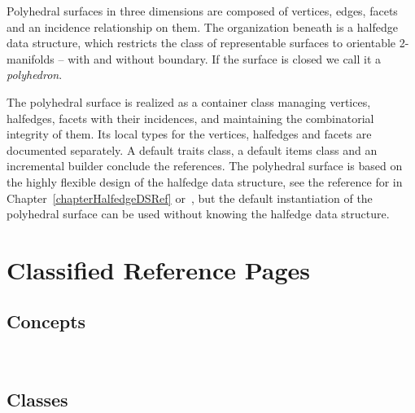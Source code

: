 
\label{chapterPolyhedronRef}



Polyhedral surfaces in three dimensions are composed of vertices,
edges, facets and an incidence relationship on them. The organization
beneath is a halfedge data structure, which restricts the class of
representable surfaces to orientable 2-manifolds -- with and without
boundary. If the surface is closed we call it a {\em polyhedron}.

The polyhedral surface is realized as a container class managing
vertices, halfedges, facets with their incidences, and maintaining the
combinatorial integrity of them. Its local types for the vertices,
halfedges and facets are documented separately.  A default traits
class, a default items class and an incremental builder conclude the
references. The polyhedral surface is based on the highly flexible
design of the halfedge data structure, see the reference for
 in Chapter~\ref{chapterHalfedgeDSRef}
or~\cite{k-ugpdd-99}, but the default instantiation of the polyhedral
surface can be used without knowing the halfedge data structure.

\section{Classified Reference Pages}

\subsection*{Concepts}

\\ 

\subsection*{Classes}

